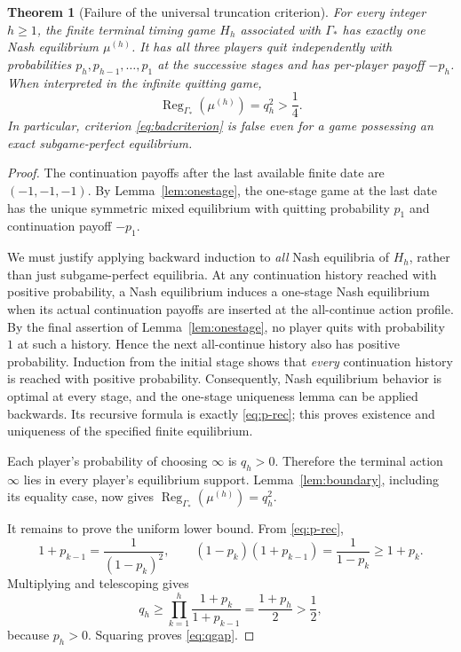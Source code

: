 \documentclass[11pt,a4paper]{article}
\numberwithin{equation}{section}
\theoremstyle{plain}
\newtheorem{theorem}{Theorem}[section]
\theoremstyle{definition}
\theoremstyle{remark}
\newcommand{\Reg}{\operatorname{Reg}}
\begin{document}
\begin{theorem}[Failure of the universal truncation criterion]\label{thm:terminal-obstruction}
For every integer $h\ge1$, the finite terminal timing game $H_h$
associated with $\Gamma_*$ has \emph{exactly one} Nash equilibrium
$\mu^{(h)}$. It has all three players quit independently with
probabilities $p_h,p_{h-1},\ldots,p_1$ at the successive stages and
has per-player payoff $-p_h$. When interpreted in the infinite quitting
game,
\begin{equation}\label{eq:qgap}
 \Reg_{\Gamma_*}(\mu^{(h)})=q_h^2>\frac14.
\end{equation}
In particular, criterion \eqref{eq:badcriterion} is false even for a
game possessing an exact subgame-perfect equilibrium.
\end{theorem}
\begin{proof}
The continuation payoffs after the last available finite date are
$(-1,-1,-1)$. By Lemma~\ref{lem:onestage}, the one-stage game at
the last date has the unique symmetric mixed equilibrium with quitting
probability $p_1$ and continuation payoff $-p_1$.

We must justify applying backward induction to \emph{all} Nash
equilibria of $H_h$, rather than just subgame-perfect equilibria.
At any continuation history reached with positive probability, a Nash
equilibrium induces a one-stage Nash equilibrium when its actual
continuation payoffs are inserted at the all-continue action profile.
By the final assertion of Lemma~\ref{lem:onestage}, no player quits
with probability $1$ at such a history. Hence the next all-continue
history also has positive probability. Induction from the initial stage
shows that \emph{every} continuation history is reached with positive
probability. Consequently, Nash equilibrium behavior is optimal at
every stage, and the one-stage uniqueness lemma can be applied
backwards. Its recursive formula is exactly \eqref{eq:p-rec}; this
proves existence and uniqueness of the specified finite equilibrium.

Each player's probability of choosing $\infty$ is $q_h>0$.
Therefore the terminal action $\infty$ lies in every player's
equilibrium support. Lemma~\ref{lem:boundary}, including its equality
case, now gives
$\Reg_{\Gamma_*}(\mu^{(h)})=q_h^2$.

It remains to prove the uniform lower bound. From \eqref{eq:p-rec},
\[
 1+p_{k-1}=\frac1{(1-p_k)^2},\qquad
 (1-p_k)(1+p_{k-1})=\frac1{1-p_k}\ge1+p_k.
\]
Multiplying and telescoping gives
\[
 q_h\ge\prod_{k=1}^h\frac{1+p_k}{1+p_{k-1}}
 =\frac{1+p_h}{2}>\frac12,
\]
because $p_h>0$. Squaring proves \eqref{eq:qgap}.
\end{proof}
\end{document}
